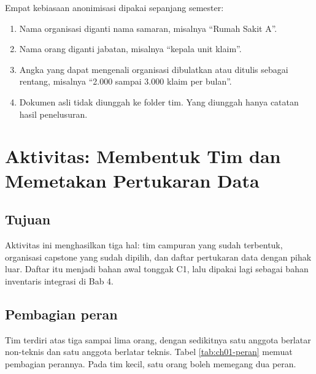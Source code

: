 Empat kebiasaan anonimisasi dipakai sepanjang semester:

\begin{enumerate}
  \item Nama organisasi diganti nama samaran, misalnya ``Rumah Sakit A''.
  \item Nama orang diganti jabatan, misalnya ``kepala unit klaim''.
  \item Angka yang dapat mengenali organisasi dibulatkan atau ditulis sebagai
        rentang, misalnya ``2.000 sampai 3.000 klaim per bulan''.
  \item Dokumen asli tidak diunggah ke folder tim. Yang diunggah hanya catatan
        hasil penelusuran.
\end{enumerate}

\section{Aktivitas: Membentuk Tim dan Memetakan Pertukaran Data}

\subsection*{Tujuan}

Aktivitas ini menghasilkan tiga hal: tim campuran yang sudah terbentuk,
organisasi capstone yang sudah dipilih, dan daftar pertukaran data dengan pihak
luar. Daftar itu menjadi bahan awal tonggak C1, lalu dipakai lagi sebagai bahan
inventaris integrasi di Bab 4.

\subsection*{Pembagian peran}

Tim terdiri atas tiga sampai lima orang, dengan sedikitnya satu anggota berlatar
non-teknis dan satu anggota berlatar teknis. Tabel \ref{tab:ch01-peran} memuat
pembagian perannya. Pada tim kecil, satu orang boleh memegang dua peran.

